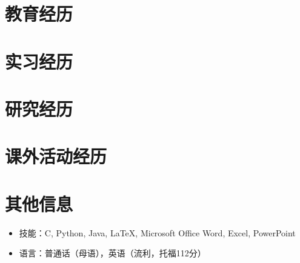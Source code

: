 \documentclass{resumeZH}
\begin{document}
\section{教育经历}

\thuundergrad
\umnexchange

\section{实习经历}

\continental
\summitview

\section{研究经历}

\fifaresearch

\section{课外活动经历}

\eydatascience

\section{其他信息}

\vspace{0.618ex}
\begin{itemize}
\item 技能：C, Python, Java, {\LaTeX}, Microsoft Office Word, Excel, PowerPoint
\item 语言：普通话（母语），英语（流利，托福112分）
\end{itemize}
\end{document}
